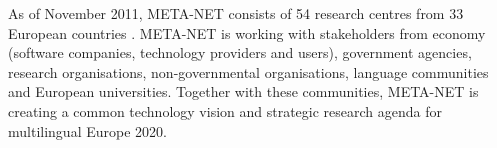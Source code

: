 \begin{Parallel}[c]{78mm}{78mm}
{As of November 2011, META-NET consists of 54 research centres from 33 European countries \cite{rehm2011}. META-NET is working with stakeholders from economy (software companies, technology providers and users), government agencies, research organisations, non-governmental organisations, language communities and European universities. Together with these communities, META-NET is creating a common technology vision and strategic research agenda for multilingual Europe 2020.} 
\ParallelPar
\end{Parallel}

\makefundingnotice

\cleardoublepage


\renewcommand\contentsname{}
\tableofcontents


\cleardoublepage

\setcounter{page}{1}
\pagestyle{scrheadings}



